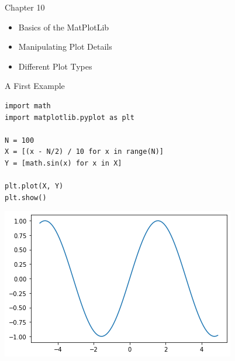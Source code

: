 
\begin{frame}[fragile]{Chapter 10}
%
\begin{itemize}
\item Basics of the MatPlotLib
\item Manipulating Plot Details
\item Different Plot Types
\end{itemize}
%
\end{frame}


\begin{frame}[fragile]{A First Example}
%
\begin{codebox}[Example: A Simple Plot, width=.53\linewidth, nobeforeafter, equal height group = grpXmpSimplePlot]
\begin{verbatim}
import math
import matplotlib.pyplot as plt

N = 100
X = [(x - N/2) / 10 for x in range(N)]
Y = [math.sin(x) for x in X]

plt.plot(X, Y)
plt.show()
\end{verbatim}
\end{codebox}
%
\begin{tcolorbox}[title=Output: A Simple Plot, width=.45\linewidth, nobeforeafter, equal height group = grpXmpSimplePlot]
	\includegraphics[width=\linewidth]{./gfx/plt-sin}
\end{tcolorbox}
%
\end{frame}


